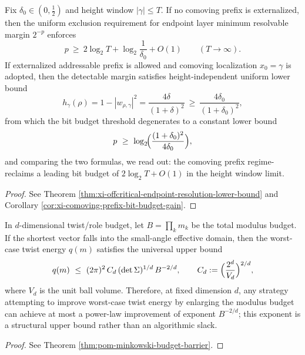 \begin{conclusion}\label{con:xi-terminal-comoving-address-bit-budget-recovery}
Fix \(\delta_0\in(0,\tfrac12)\) and height window \(|\gamma|\le T\).
If no comoving prefix is externalized, then the uniform exclusion requirement for endpoint layer minimum resolvable margin \(2^{-p}\) enforces
\[
p\ \ge\ 2\log_2 T+\log_2\!\frac{1}{\delta_0}+O(1)\qquad (T\to\infty).
\]
If externalized addressable prefix is allowed and comoving localization \(x_0=\gamma\) is adopted, then the detectable margin satisfies height-independent uniform lower bound
\[
h_{\gamma}(\rho)=1-|w_{\rho,\gamma}|^2=\frac{4\delta}{(1+\delta)^2}\ \ge\ \frac{4\delta_0}{(1+\delta_0)^2},
\]
from which the bit budget threshold degenerates to a constant lower bound
\[
p\ \ge\ \log_2\!\Bigl(\frac{(1+\delta_0)^2}{4\delta_0}\Bigr),
\]
and comparing the two formulas, we read out: the comoving prefix regime-reclaims a leading bit budget of \(2\log_2T+O(1)\) in the height window limit.
\end{conclusion}
\begin{proof}[Proof]
See Theorem \ref{thm:xi-offcritical-endpoint-resolution-lower-bound} and Corollary \ref{cor:xi-comoving-prefix-bit-budget-gain}.
\end{proof}

\begin{conclusion}\label{con:xi-terminal-minkowski-budget-barrier}
In \(d\)-dimensional twist/role budget, let \(B=\prod_k m_k\) be the total modulus budget.
If the shortest vector falls into the small-angle effective domain, then the worst-case twist energy \(q(m)\) satisfies the universal upper bound
\[
q(m)\ \le\ (2\pi)^2\,C_d\,(\det\Sigma)^{1/d}\,B^{-2/d},
\qquad
C_d:=\Bigl(\frac{2^{d}}{V_d}\Bigr)^{2/d},
\]
where \(V_d\) is the unit ball volume.
Therefore, at fixed dimension \(d\), any strategy attempting to improve worst-case twist energy by enlarging the modulus budget can achieve at most a power-law improvement of exponent \(B^{-2/d}\); this exponent is a structural upper bound rather than an algorithmic slack.
\end{conclusion}
\begin{proof}[Proof]
See Theorem \ref{thm:pom-minkowski-budget-barrier}.
\end{proof}

